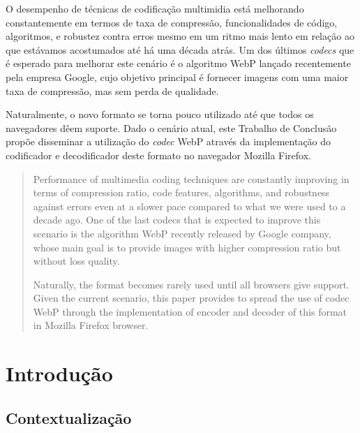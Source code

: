 \documentclass[espaco=simples,appendix=Name]{abnt}
\begin{document}
\capa
\folhaderosto
\listoffigures
\listoftables

\sumario

\newcommand{\ingles}[1]{\textsl{#1}}
\newcommand{\bibTeX}{bib\kern-.13ex\TeX}

\begin{resumo}
O desempenho de técnicas de codificação multimidia está melhorando constantemente em termos de taxa de compressão, funcionalidades de código, algoritmos, e robustez contra erros mesmo em um ritmo mais lento em relação ao que estávamos acostumados até há uma década atrás. Um dos últimos \ingles{codecs} que é esperado para melhorar este cenário é o algoritmo WebP lançado recentemente pela empresa Google, cujo objetivo principal é fornecer imagens com uma maior taxa de compressão, mas sem perda de qualidade. 

Naturalmente, o novo formato se torna pouco utilizado até que todos os navegadores dêem suporte. Dado o cenário atual, este Trabalho de Conclusão propõe disseminar a utilização do \ingles{codec} WebP através da implementação do codificador e decodificador deste formato no navegador Mozilla Firefox.
\end{resumo}

\begin{abstract}
Performance of multimedia coding techniques are constantly improving in terms of compression ratio, code features, algorithms, and robustness against errors even at a slower pace compared to what we were used to a decade ago. One of the last codecs that is expected to improve this scenario is the algorithm WebP recently released by Google company, whose main goal is to provide images with higher compression ratio but without loss quality. 

Naturally, the format becomes rarely used until all browsers give support. Given the current scenario, this paper provides to spread the use of codec WebP through the implementation of encoder and decoder of this format in Mozilla Firefox browser.
\end{abstract}

\onehalfspacing

\chapter{Introdução}

\section{Contextualização}
\end{document}
